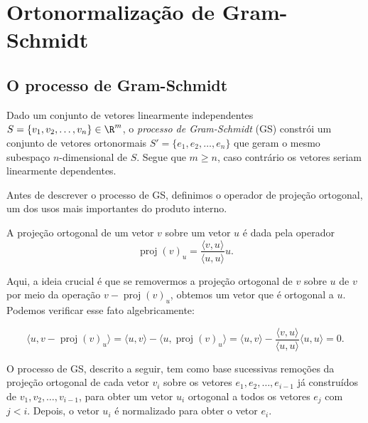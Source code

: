 \documentclass{article}
\DeclareMathOperator{\proj}{proj}
\begin{document}
\section{Ortonormalização de Gram-Schmidt}

\subsection{O processo de Gram-Schmidt}

Dado um conjunto de vetores linearmente independentes \(S = \{v_1, v_2, \ldots, v_n\} \in \R^m\), o \emph{processo de Gram-Schmidt} (GS) constrói um conjunto de vetores ortonormais \(S' = \{e_1, e_2, \ldots, e_n\}\) que geram o mesmo subespaço \(n\)-dimensional de \(S\). Segue que \(m \geq n\), caso contrário os vetores seriam linearmente dependentes.

Antes de descrever o processo de GS, definimos o operador de projeção ortogonal, um dos usos mais importantes do produto interno.

\begin{defn}
    A projeção ortogonal de um vetor \(v\) sobre um vetor \(u\) é dada pela operador 
    \[
        \proj (v)_u = \frac{\langle v, u \rangle}{\langle u, u \rangle} u.
    \]
\end{defn}

Aqui, a ideia crucial é que se removermos a projeção ortogonal de \(v\) sobre \(u\) de \(v\) por meio da operação \(v - \proj(v)_u\), obtemos um vetor que é ortogonal a \(u\). Podemos verificar esse fato algebricamente:

\begin{equation*}
    \langle u, v - \proj(v)_u \rangle = \langle u, v \rangle - \langle u, \proj(v)_u \rangle = \langle u, v \rangle - \frac{\langle v, u \rangle}{\langle u, u \rangle} \langle u, u \rangle = 0.
\end{equation*}

O processo de GS, descrito a seguir, tem como base sucessivas remoções da projeção ortogonal de cada vetor \(v_i\) sobre os vetores \(e_1, e_2, \ldots, e_{i-1}\) já construídos de \(v_1, v_2, \ldots, v_{i-1}\), para obter um vetor \(u_i\) ortogonal a todos os vetores \(e_j\) com \(j < i\). Depois, o vetor \(u_i\) é normalizado para obter o vetor \(e_i\).
\end{document}

